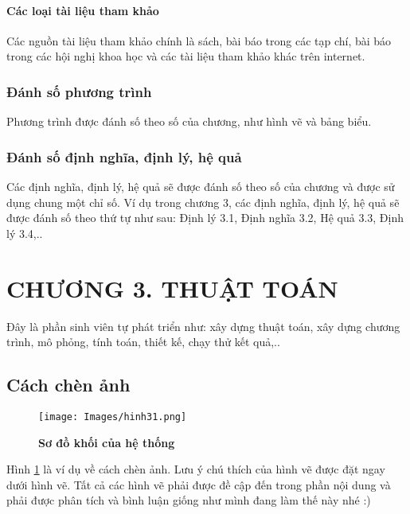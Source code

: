 \documentclass{article} %
\begin{document}
\paragraph{Các loại tài liệu tham khảo}\mbox{}

Các nguồn tài liệu tham khảo chính là sách, bài báo trong các tạp chí, bài báo trong các hội nghị khoa học và các tài liệu tham khảo khác trên internet.

\subsubsection{Đánh số phương trình}
Phương trình được đánh số theo số của chương, như hình vẽ và bảng biểu.
\subsubsection{Đánh số định nghĩa, định lý, hệ quả}
Các định nghĩa, định lý, hệ quả sẽ được đánh số theo số của chương và được sử dụng chung một chỉ số. Ví dụ trong chương 3, các định nghĩa, định lý, hệ quả sẽ được đánh số theo thứ tự như sau: Định lý 3.1, Định nghĩa 3.2, Hệ quả 3.3, Định lý 3.4,..

\newpage
\section*{CHƯƠNG 3. THUẬT TOÁN}
\setcounter{section}{3}
\setcounter{subsection}{0}
\setcounter{figure}{0}
\setcounter{table}{0}
Đây là phần sinh viên tự phát triển như: xây dựng thuật toán, xây dựng chương trình, mô phỏng, tính toán, thiết kế, chạy thử kết quả,..
\subsection{Cách chèn ảnh}
\begin{figure}[!ht]
    \centering
    \texttt{[image: Images/hinh31.png]}
    \caption[Sơ đồ khối của hệ thống]{\bfseries \fontsize{12pt}{0pt}\selectfont Sơ đồ khối của hệ thống}
    \label{hinh31}
\end{figure}
Hình \ref{hinh31} là ví dụ về cách chèn ảnh. Lưu ý chú thích của hình vẽ được đặt ngay dưới hình vẽ. Tất cả các hình vẽ phải được đề cập đến trong phần nội dung và phải được phân tích và bình luận giống như mình đang làm thế này nhé :)
\end{document}
